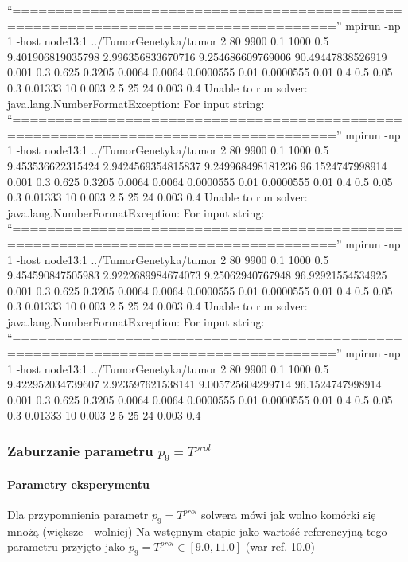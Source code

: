 \documentclass[]{article}
\let\oldparagraph\paragraph
\renewcommand{\paragraph}[1]{\oldparagraph{#1}\mbox{}}
\begin{document}
``===================================================================================''
mpirun -np 1 -host node13:1 ../TumorGenetyka/tumor 2 80 9900 0.1 1000
0.5 9.401906819035798 2.996356833670716 9.254686609769006
90.49447838526919 0.001 0.3 0.625 0.3205 0.0064 0.0064 0.0000555 0.01
0.0000555 0.01 0.4 0.5 0.05 0.3 0.01333 10 0.003 2 5 25 24 0.003 0.4
Unable to run solver: java.lang.NumberFormatException: For input string:
``===================================================================================''
mpirun -np 1 -host node13:1 ../TumorGenetyka/tumor 2 80 9900 0.1 1000
0.5 9.453536622315424 2.9424569354815837 9.249968498181236
96.1524747998914 0.001 0.3 0.625 0.3205 0.0064 0.0064 0.0000555 0.01
0.0000555 0.01 0.4 0.5 0.05 0.3 0.01333 10 0.003 2 5 25 24 0.003 0.4
Unable to run solver: java.lang.NumberFormatException: For input string:
``===================================================================================''
mpirun -np 1 -host node13:1 ../TumorGenetyka/tumor 2 80 9900 0.1 1000
0.5 9.454590847505983 2.9222689984674073 9.25062940767948
96.92921554534925 0.001 0.3 0.625 0.3205 0.0064 0.0064 0.0000555 0.01
0.0000555 0.01 0.4 0.5 0.05 0.3 0.01333 10 0.003 2 5 25 24 0.003 0.4
Unable to run solver: java.lang.NumberFormatException: For input string:
``===================================================================================''
mpirun -np 1 -host node13:1 ../TumorGenetyka/tumor 2 80 9900 0.1 1000
0.5 9.422952034739607 2.923597621538141 9.005725604299714
96.1524747998914 0.001 0.3 0.625 0.3205 0.0064 0.0064 0.0000555 0.01
0.0000555 0.01 0.4 0.5 0.05 0.3 0.01333 10 0.003 2 5 25 24 0.003 0.4

\pagebreak
\pagebreak

\subsubsection{\texorpdfstring{Zaburzanie parametru
\(p_9=T^{prol}\)}{Zaburzanie parametru p\_9=T\^{}\{prol\}}}\label{zaburzanie-parametru-pux5f9tprol}

\paragraph{Parametry eksperymentu}\label{parametry-eksperymentu-2}

Dla przypomnienia parametr \(p_9=T^{prol}\) solwera mówi jak wolno
komórki się mnożą (większe - wolniej) Na wstępnym etapie jako wartość
referencyjną tego parametru przyjęto jako
\(p_9=T^{prol} \in [9.0,11.0]\) (war ref. 10.0)
\end{document}
